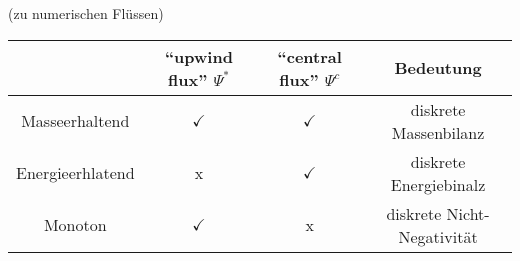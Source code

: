 \begin{remark}(zu numerischen Flüssen)
	

	\begin{tabular}{c || c | c | c}
		&\enquote{upwind flux} $ \Psi^* $ & \enquote{central flux} $ \Psi^c $ & Bedeutung \\ \hline 
		Masseerhaltend & $\checkmark$ & $\checkmark$ & diskrete Massenbilanz \\ \hline
		Energieerhlatend &  x  & $ \checkmark $ & diskrete Energiebinalz\\ \hline
		Monoton & $ \checkmark $ & x & diskrete Nicht-Negativität \\
	\end{tabular}
\end{remark}


